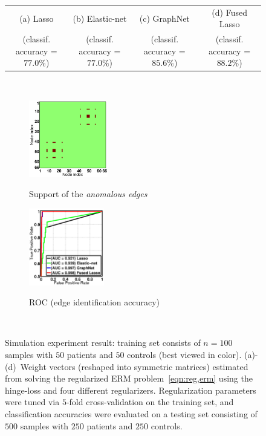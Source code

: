 \begin{figure}[ptbh]
\begin{tabular}{cccc}
		\small{(a) Lasso} & \small{(b) Elastic-net} & \small{(c) GraphNet} & \small{(d) Fused Lasso} \\
		\footnotesize{(classif. accuracy = $77.0\%$)} &
		\footnotesize{(classif. accuracy = $77.0\%$)} &
		\footnotesize{(classif. accuracy = $85.6\%$)} &
		\footnotesize{(classif. accuracy = $88.2\%$)} \\
	\end{tabular} \vspace{0pt}\\
	\renewcommand{\imwidth} {0.4\linewidth}	
	\begin{subfigure}[b]{\imwidth}\setcounter{subfigure}{4}
		\centering
		\includegraphics[height=95pt]{sim_best_weight_truth.pdf}
		\vspace{-4pt}\\
		\caption{Support of the \emph{anomalous edges}}
		\label{subfig:sim,edge,truth}
	\end{subfigure}
	\hspace{10pt}
	\begin{subfigure}[b]{\imwidth}
		\centering
		\includegraphics[height=95pt]{sim_best_weight_roc100.pdf}
		\vspace{-4pt}\\
		\caption{ROC (edge identification accuracy)}
		\label{subfig:sim,roc}
	\end{subfigure}
	\vspace{-5pt}\\
	\caption{
		Simulation experiment result: training set consists of $n=100$ samples with $50$ patients and $50$ controls (best viewed in color).  
		\mbox{(a)-(d) Weight} vectors (reshaped into symmetric matrices) estimated from solving the regularized ERM problem~\eqref{eqn:reg,erm} using the hinge-loss and four different regularizers.
		Regularization parameters were tuned via $5$-fold cross-validation on the training set, and classification accuracies were evaluated on a testing set consisting of $500$ samples with $250$ patients and $250$ controls.
}
\end{figure}

